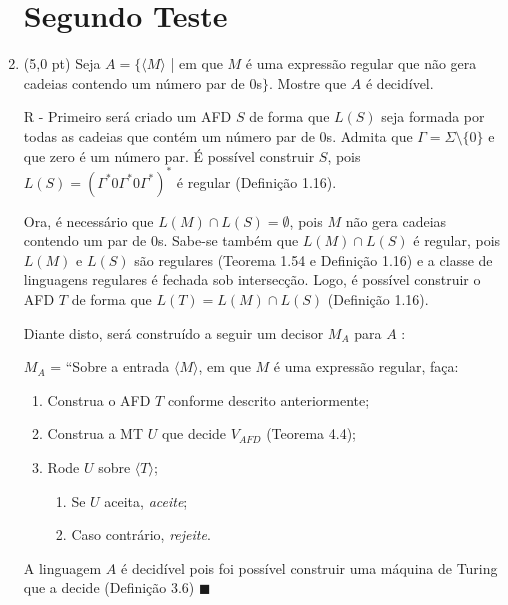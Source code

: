 \documentclass[12pt,a4paper,oneside]{article}
\begin{document}
\begin{enumerate}
	
	\section*{Segundo Teste}
	
	\item (5,0 pt) Seja $A = \{ \langle M \rangle$ | em que $M$ é uma expressão regular que não gera cadeias contendo um número par de $0$s$\}$. Mostre que $A$ é decidível.
	
	\vspace{0.3cm}
	
	{\color{verde}
		R - Primeiro será criado um AFD $S$ de forma que $L(S)$ seja formada por todas as cadeias que contém um número par de 0s. Admita que $\Gamma = \Sigma \setminus \{ 0 \}$ e que zero é um número par. É possível construir $S$, pois $L(S) = (\Gamma^* 0 \Gamma^* 0 \Gamma^*)^*$ é regular (Definição 1.16). 
		
		Ora, é necessário que $L(M) \cap L(S) = \emptyset$, pois $M$ não gera cadeias contendo um par de $0$s. Sabe-se também que $L(M) \cap L(S)$ é regular, pois $L(M)$ e $L(S)$ são regulares (Teorema 1.54 e Definição 1.16) e a classe de linguagens regulares é fechada sob intersecção. Logo, é possível construir o AFD $T$ de forma que $L(T) = L(M) \cap L(S)$ (Definição 1.16). 
		
		Diante disto, será construído a seguir um decisor $M_A$ para $A$ :
		
		$M_A$ = ``Sobre a entrada $\langle M \rangle$, em que $M$ é uma expressão regular, faça:
			\begin{enumerate}
				\item Construa o AFD $T$ conforme descrito anteriormente;
				\item Construa a MT $U$ que decide $V_{AFD}$ (Teorema 4.4);
				\item Rode $U$ sobre $\langle T \rangle$;
				\begin{enumerate}
					\item Se $U$ aceita, {\it aceite};
					\item Caso contrário, {\it rejeite}.
				\end{enumerate}					
			\end{enumerate}
		
		A linguagem $A$ é decidível pois foi possível construir uma máquina de Turing que a decide (Definição 3.6) $\blacksquare$
		
	}
	

\end{enumerate}
\end{document}
